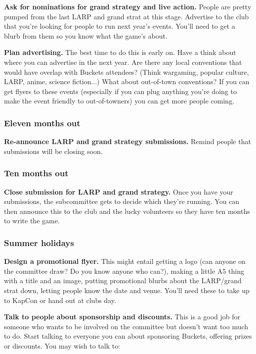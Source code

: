\textbf{Ask for nominations for grand strategy and live action.} People are pretty pumped from the last LARP and grand strat at this stage. Advertise to the club that you're looking for people to run next year's events. You'll need to get a blurb from them so you know what the game's about.

\textbf{Plan advertising.} The best time to do this is early on. Have a think about where you can advertise in the next year. Are there any local conventions that would have overlap with Buckets attendees? (Think wargaming, popular culture, LARP, anime, science fiction...) What about out-of-town conventions? If you can get flyers to these events (especially if you can plug anything you're doing to make the event friendly to out-of-towners) you can get more people coming.

\subsubsection{Eleven months out}

\textbf{Re-announce LARP and grand strategy submissions.} Remind people that submissions will be closing soon.

\subsubsection{Ten months out}

\textbf{Close submission for LARP and grand strategy.} Once you have your submissions, the subcommittee gets to decide which they're running. You can then announce this to the club and the lucky volunteers so they have ten months to write the game.

\subsubsection{Summer holidays}

\textbf{Design a promotional flyer.} This might entail getting a logo (can anyone on the committee draw? Do you know anyone who can?), making a little A5 thing with a title and an image, putting promotional blurbs about the LARP/grand strat down, letting people know the date and venue. You'll need these to take up to KapCon or hand out at clubs day.

\textbf{Talk to people about sponsorship and discounts.} This is a good job for someone who wants to be involved on the committee but doesn't want too much to do. Start talking to everyone you can about sponsoring Buckets, offering prizes or discounts. You may wish to talk to:

